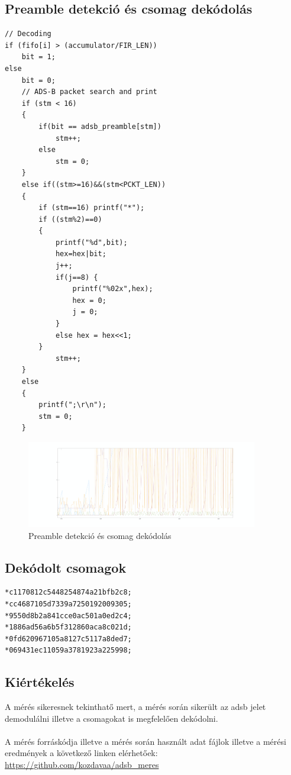 \newpage
\subsection{Preamble detekció és csomag dekódolás}
\begin{lstlisting}
// Decoding
if (fifo[i] > (accumulator/FIR_LEN))
    bit = 1;
else
	bit = 0;
	// ADS-B packet search and print
	if (stm < 16)
	{
		if(bit == adsb_preamble[stm])
			stm++;
        else
			stm = 0;
    }
	else if((stm>=16)&&(stm<PCKT_LEN))
	{
		if (stm==16) printf("*");
		if ((stm%2)==0)
		{
			printf("%d",bit);
			hex=hex|bit;
			j++;
			if(j==8) {
                printf("%02x",hex);
				hex = 0;
				j = 0;
			}
			else hex = hex<<1;
		}
            stm++;
	}
	else
	{
		printf(";\r\n");
		stm = 0;
	}
\end{lstlisting}
\begin{figure}[h]
    \centering
    \includegraphics[width=0.9\textwidth]{../meres/result/preambledet_datacalc.png}
    \caption{Preamble detekció és csomag dekódolás}
    \label{fig:deceison}
\end{figure}

\subsection{Dekódolt csomagok}
\begin{lstlisting}
*c1170812c5448254874a21bfb2c8;
*cc4687105d7339a7250192009305;
*9550d8b2a841cce0ac501a0ed2c4;
*1886ad56a6b5f312860aca8c021d;
*0fd620967105a8127c5117a8ded7;
*069431ec11059a3781923a225998;
\end{lstlisting}

\subsection{Kiértékelés}
A mérés sikeresnek tekinthatő mert, a mérés során sikerült az adsb jelet demodulálni illetve a csomagokat is megfelelően dekódolni.\\
\\
A mérés forráskódja illetve a mérés során használt adat fájlok illetve a mérési eredmények a következő linken elérhetőek: \url{https://github.com/kozdavaa/adsb_meres}
